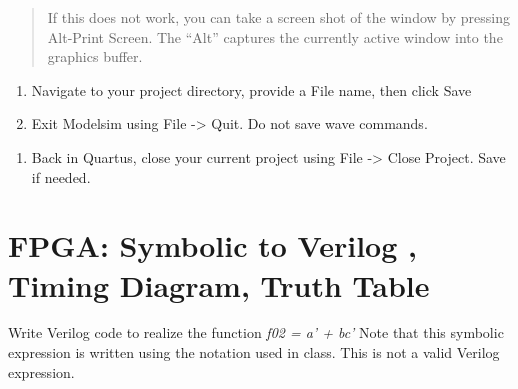\begin{quote}
    If this does not work, you can take a screen shot of the window by
    pressing Alt-Print Screen. The ``Alt'' captures the currently active
    window into the graphics buffer.
\end{quote}

\begin{enumerate}
        \def\labelenumi{\alph{enumi}.}
        \setcounter{enumi}{4}
    \item
        Navigate to your project directory, provide a File name, then click
        Save
    \item
        Exit Modelsim using File -\textgreater{} Quit. Do not save wave
        commands.
\end{enumerate}

\begin{enumerate}
        \def\labelenumi{\arabic{enumi}.}
        \setcounter{enumi}{23}
    \item
        Back in Quartus, close your current project using File -\textgreater{}
        Close Project. Save if needed.
\end{enumerate}

\section{FPGA: Symbolic to Verilog , Timing Diagram, Truth Table}
Write Verilog code to realize the function \emph{f02 = a' + bc'} Note
that this symbolic expression is written using the notation used in
class. This is not a valid Verilog expression.


